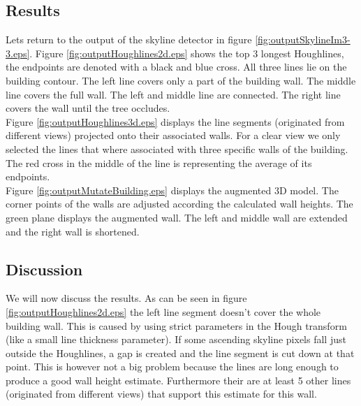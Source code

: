 \documentclass[10pt]{article}
\begin{document}
	

\subsection{Results}
\noindent
{}
Lets return to the output of the skyline detector in figure \ref{fig:outputSkylineIm3-3.eps}.
Figure \ref{fig:outputHoughlines2d.eps} shows the top 3 longest Houghlines, the
endpoints are denoted with a black and blue cross. All three lines lie on the
building contour.  The left line covers only a part of the building wall. The
middle line covers the full wall. The left and middle line are connected. The
right line covers the wall until the tree occludes.\\

Figure \ref{fig:outputHoughlines3d.eps} displays the line segments (originated from
different views) projected onto their associated walls.  For a clear view we
only selected the lines that where associated with three specific walls of the building.  
The red cross in the middle of the line is representing the average of its endpoints.\\

Figure \ref{fig:outputMutateBuilding.eps} displays the augmented 3D model. The
corner points of the walls are adjusted according the calculated wall heights.
The green plane displays the augmented wall. The left and middle wall are extended
and the right wall is shortened.\\


\subsection{Discussion}
We will now discuss the results. As can be seen in figure
\ref{fig:outputHoughlines2d.eps} the left line segment doesn't cover the whole
building wall. This is caused by using strict parameters in the Hough transform
(like a small line thickness parameter).  If some ascending skyline pixels fall just outside
the Houghlines, a gap is created and the line segment is cut down at that point.
This is however not a big problem because the lines are long enough to produce a
good wall height estimate. Furthermore their are at least 5 other lines
(originated from different views) that
support this estimate for this wall.\\
\end{document}
